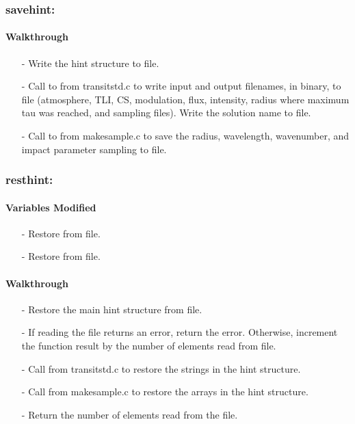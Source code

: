 \documentclass[letterpaper,12pt]{article}
\begin{document}
\subsubsection{savehint:}
\paragraph{Walkthrough}
\begin{enumerate}[leftmargin=10pt, noitemsep, parsep=0pt, topsep=0ex]
\item[-] Write the hint structure to file.
\item[-] Call to  from transitstd.c to write input and output filenames, in binary, to file (atmosphere, TLI, CS, modulation, flux, intensity, radius where maximum tau was reached, and sampling files). Write the solution name to file.
\item[-] Call to  from makesample.c to save the radius, wavelength, wavenumber, and impact parameter sampling to file.
\end{enumerate}

\subsubsection{resthint:}
\paragraph{Variables Modified}
\begin{enumerate}[leftmargin=10pt, noitemsep, parsep=0pt, topsep=0ex]
\item[-] Restore  from file.
\item[-] Restore  from file.
\end{enumerate}

\paragraph{Walkthrough}
\begin{enumerate}[leftmargin=10pt, noitemsep, parsep=0pt, topsep=0ex]
\item[-] Restore the main hint structure from file.
\item[-] If reading the file returns an error, return the error. Otherwise, increment the function result by the number of elements read from file.
\item[-] Call  from transitstd.c to restore the strings in the hint structure.
\item[-] Call  from makesample.c to restore the arrays in the hint structure.
\item[-] Return the number of elements read from the file.
\end{enumerate}
\end{document}
